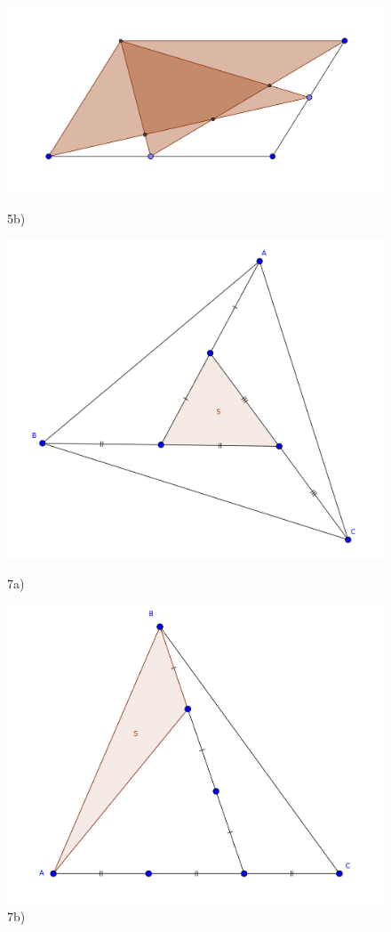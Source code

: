 \begin{figure}[h]
\includegraphics[width=1.2\linewidth]{2c}
\caption{5b)}
\endminipage\hfill
{}
\includegraphics[width=1.2\linewidth]{7a}
\caption{7a)}
\endminipage\hfill
{}
\includegraphics[width=1.2\linewidth]{7b}
\caption{7b)}
\endminipage
\end{figure}

